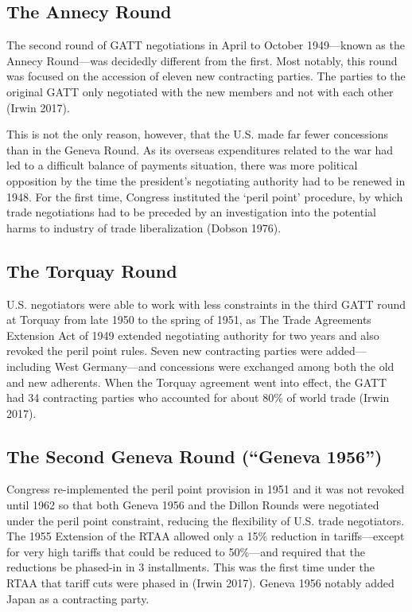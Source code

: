 \documentclass[
  12pt,
]{article}
\begin{document}
\hypertarget{the-annecy-round}{%
\subsection{The Annecy Round}\label{the-annecy-round}}

The second round of GATT negotiations in April to October 1949---known as the Annecy Round---was decidedly different from the first. Most notably, this round was focused on the accession of eleven new contracting parties. The parties to the original GATT only negotiated with the new members and not with each other (Irwin 2017).

This is not the only reason, however, that the U.S. made far fewer concessions than in the Geneva Round. As its overseas expenditures related to the war had led to a difficult balance of payments situation, there was more political opposition by the time the president's negotiating authority had to be renewed in 1948. For the first time, Congress instituted the `peril point' procedure, by which trade negotiations had to be preceded by an investigation into the potential harms to industry of trade liberalization (Dobson 1976).

\hypertarget{the-torquay-round}{%
\subsection{The Torquay Round}\label{the-torquay-round}}

U.S. negotiators were able to work with less constraints in the third GATT round at Torquay from late 1950 to the spring of 1951, as The Trade Agreements Extension Act of 1949 extended negotiating authority for two years and also revoked the peril point rules. Seven new contracting parties were added---including West Germany---and concessions were exchanged among both the old and new adherents. When the Torquay agreement went into effect, the GATT had 34 contracting parties who accounted for about 80\% of world trade (Irwin 2017).

\hypertarget{the-second-geneva-round-geneva-1956}{%
\subsection{The Second Geneva Round (``Geneva 1956'')}\label{the-second-geneva-round-geneva-1956}}

Congress re-implemented the peril point provision in 1951 and it was not revoked until 1962 so that both Geneva 1956 and the Dillon Rounds were negotiated under the peril point constraint, reducing the flexibility of U.S. trade negotiators. The 1955 Extension of the RTAA allowed only a 15\% reduction in tariffs---except for very high tariffs that could be reduced to 50\%---and required that the reductions be phased-in in 3 installments. This was the first time under the RTAA that tariff cuts were phased in (Irwin 2017). Geneva 1956 notably added Japan as a contracting party.
\end{document}
